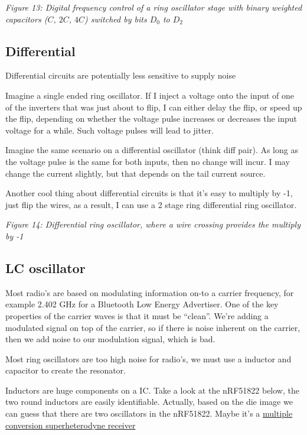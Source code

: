 \emph{Figure 13: Digital frequency control of a ring oscillator stage
with binary weighted capacitors (\(C\), \(2C\), \(4C\)) switched by bits
\(D_0\) to \(D_2\)}

\subsection{Differential}\label{differential}

Differential circuits are potentially less sensitive to supply noise

Imagine a single ended ring oscillator. If I inject a voltage onto the
input of one of the inverters that was just about to flip, I can either
delay the flip, or speed up the flip, depending on whether the voltage
pulse increases or decreases the input voltage for a while. Such voltage
pulses will lead to jitter.

Imagine the same scenario on a differential oscillator (think diff
pair). As long as the voltage pulse is the same for both inputs, then no
change will incur. I may change the current slightly, but that depends
on the tail current source.

Another cool thing about differential circuits is that it's easy to
multiply by -1, just flip the wires, as a result, I can use a 2 stage
ring differential ring oscillator.


{
\centering
{}
}

\emph{Figure 14: Differential ring oscillator, where a wire crossing
provides the multiply by -1}

\subsection{LC oscillator}\label{lc-oscillator}

Most radio's are based on modulating information on-to a carrier
frequency, for example 2.402 GHz for a Bluetooth Low Energy Advertiser.
One of the key properties of the carrier waves is that it must be
``clean''. We're adding a modulated signal on top of the carrier, so if
there is noise inherent on the carrier, then we add noise to our
modulation signal, which is bad.

Most ring oscillators are too high noise for radio's, we must use a
inductor and capacitor to create the resonator.

Inductors are huge components on a IC. Take a look at the nRF51822
below, the two round inductors are easily identifiable. Actually, based
on the die image we can guess that there are two oscillators in the
nRF51822. Maybe it's a
\href{https://en.wikipedia.org/wiki/Superheterodyne_receiver\#Multiple_conversion}{multiple
conversion superheterodyne receiver}



